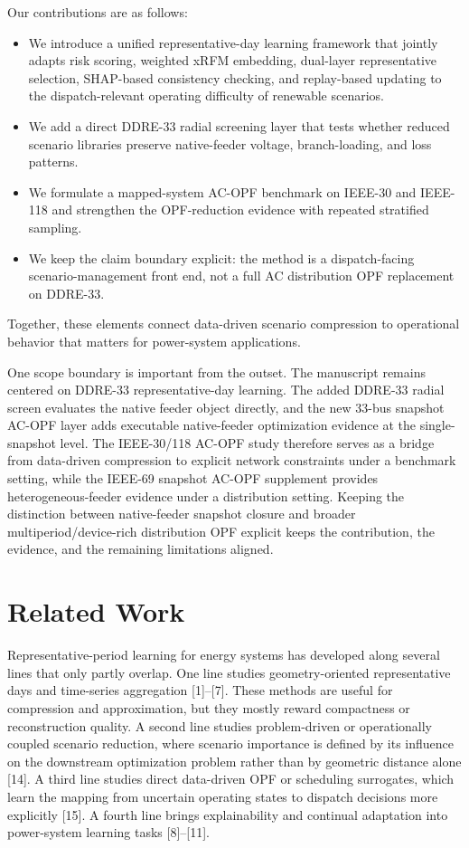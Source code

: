 \documentclass[journal]{IEEEtran}
\begin{document}
Our contributions are as follows:
\begin{itemize}
\item We introduce a unified representative-day learning framework that jointly adapts risk scoring, weighted xRFM embedding, dual-layer representative selection, SHAP-based consistency checking, and replay-based updating to the dispatch-relevant operating difficulty of renewable scenarios.
\item We add a direct DDRE-33 radial screening layer that tests whether reduced scenario libraries preserve native-feeder voltage, branch-loading, and loss patterns.
\item We formulate a mapped-system AC-OPF benchmark on IEEE-30 and IEEE-118 and strengthen the OPF-reduction evidence with repeated stratified sampling.
\item We keep the claim boundary explicit: the method is a dispatch-facing scenario-management front end, not a full AC distribution OPF replacement on DDRE-33.
\end{itemize}
Together, these elements connect data-driven scenario compression to operational behavior that matters for power-system applications.

One scope boundary is important from the outset. The manuscript remains centered on DDRE-33 representative-day learning. The added DDRE-33 radial screen evaluates the native feeder object directly, and the new 33-bus snapshot AC-OPF layer adds executable native-feeder optimization evidence at the single-snapshot level. The IEEE-30/118 AC-OPF study therefore serves as a bridge from data-driven compression to explicit network constraints under a benchmark setting, while the IEEE-69 snapshot AC-OPF supplement provides heterogeneous-feeder evidence under a distribution setting. Keeping the distinction between native-feeder snapshot closure and broader multiperiod/device-rich distribution OPF explicit keeps the contribution, the evidence, and the remaining limitations aligned.

\section{Related Work}
Representative-period learning for energy systems has developed along several lines that only partly overlap. One line studies geometry-oriented representative days and time-series aggregation [1]--[7]. These methods are useful for compression and approximation, but they mostly reward compactness or reconstruction quality. A second line studies problem-driven or operationally coupled scenario reduction, where scenario importance is defined by its influence on the downstream optimization problem rather than by geometric distance alone [14]. A third line studies direct data-driven OPF or scheduling surrogates, which learn the mapping from uncertain operating states to dispatch decisions more explicitly [15]. A fourth line brings explainability and continual adaptation into power-system learning tasks [8]--[11].
\end{document}
